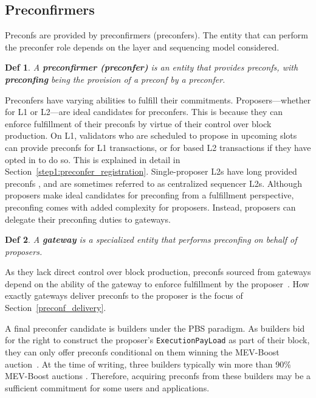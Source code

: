 \documentclass[a4paper]{article}
\theoremstyle{boldstyle}
\newtheorem*{definitionx}{Def}
\newenvironment{definition}
  {\begin{defopenboxq}\begin{definitionx}}
  {\end{definitionx}\end{defopenboxq}}
\begin{document}
    \subsection{Preconfirmers}
        Preconfs are provided by preconfirmers (preconfers). The entity that can perform the preconfer role depends on the layer and sequencing model considered. 
        \begin{definition}
        A \textbf{preconfirmer (preconfer)} is an entity that provides preconfs, with \textbf{preconfing} being the provision of a preconf by a preconfer.
        \end{definition}
        Preconfers have varying abilities to fulfill their commitments. Proposers—whether for L1 or L2—are ideal candidates for preconfers. This is because they can enforce fulfillment of their preconfs by virtue of their control over block production.
        On L1, validators who are scheduled to propose in upcoming slots can provide preconfs for L1 transactions, or for based L2 transactions if they have opted in to do so.  This is explained in detail in Section~\ref{step1:preconfer_registration}. 
        Single-proposer L2s have long provided preconfs \cite{Optimism, Arbitrum, ZKsync, Starknet}, and are sometimes referred to as centralized sequencer L2s.  
        Although proposers make ideal candidates for preconfing from a fulfillment perspective, preconfing comes with added complexity for proposers. Instead, proposers can delegate their preconfing duties to gateways.
        \begin{definition}
        A \textbf{gateway} is a specialized entity that performs preconfing on behalf of proposers.
        \end{definition}
        As they lack direct control over block production, preconfs sourced from gateways depend on the ability of the gateway to enforce fulfillment by the proposer~\cite{W:ThePreconfirmationGatewayUnlockingPreconfirmations:FromUsertoPreconfer, W:Ahead-of-TimeBlockAuctionsToEnableExecutionPreconfirmations,W:DelegationinBolt:OutsourcingSophisticationWhilePreservingDecentralization}. How exactly gateways deliver preconfs to the proposer is the focus of Section~\ref{preconf_delivery}.       
        
        A final preconfer candidate is builders under the PBS paradigm. As builders bid for the right to construct the proposer's \texttt{ExecutionPayLoad} as part of their block, they can only offer preconfs conditional on them winning the MEV-Boost auction~\cite{W:PreconfirmationFairExchange,W:LeaderlessandLeader-BasedPreconfirmations}. At the time of writing, three builders typically win more than 90\% MEV-Boost auctions \cite{MEV.pics}. Therefore, acquiring preconfs from these builders may be a sufficient commitment for some users and applications. 
\end{document}
